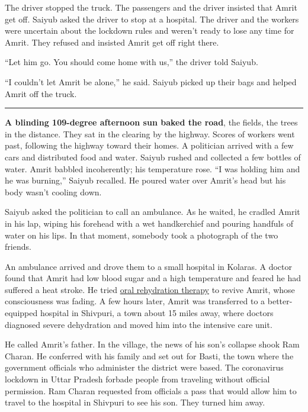 The driver stopped the truck. The passengers and the driver insisted
that Amrit get off. Saiyub asked the driver to stop at a hospital. The
driver and the workers were uncertain about the lockdown rules and
weren't ready to lose any time for Amrit. They refused and insisted
Amrit get off right there.

``Let him go. You should come home with us,'' the driver told Saiyub.

``I couldn't let Amrit be alone,'' he said. Saiyub picked up their bags
and helped Amrit off the truck.

\begin{center}\rule{0.5\linewidth}{\linethickness}\end{center}

\textbf{A blinding 109-degree afternoon sun baked the road}, the fields,
the trees in the distance. They sat in the clearing by the highway.
Scores of workers went past, following the highway toward their homes. A
politician arrived with a few cars and distributed food and water.
Saiyub rushed and collected a few bottles of water. Amrit babbled
incoherently; his temperature rose. ``I was holding him and he was
burning,'' Saiyub recalled. He poured water over Amrit's head but his
body wasn't cooling down.

Saiyub asked the politician to call an ambulance. As he waited, he
cradled Amrit in his lap, wiping his forehead with a wet handkerchief
and pouring handfuls of water on his lips. In that moment, somebody took
a photograph of the two friends.

An ambulance arrived and drove them to a small hospital in Kolaras. A
doctor found that Amrit had low blood sugar and a high temperature and
feared he had suffered a heat stroke. He tried
\href{https://indianexpress.com/article/india/lockdown-migrant-labourers-friends-deaths-coronavirus-lockdown-6414810/}{oral
rehydration therapy} to revive Amrit, whose consciousness was fading. A
few hours later, Amrit was transferred to a better-equipped hospital in
Shivpuri, a town about 15 miles away, where doctors diagnosed severe
dehydration and moved him into the intensive care unit.

He called Amrit's father. In the village, the news of his son's collapse
shook Ram Charan. He conferred with his family and set out for Basti,
the town where the government officials who administer the district were
based. The coronavirus lockdown in Uttar Pradesh forbade people from
traveling without official permission. Ram Charan requested from
officials a pass that would allow him to travel to the hospital in
Shivpuri to see his son. They turned him away.

